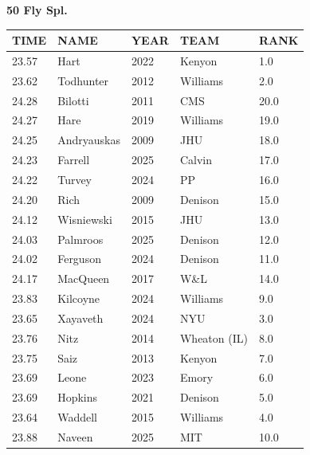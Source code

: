 \begin{table}[H]
\centering
\begin{minipage}[t]{0.6\textwidth}
\centering
\textbf{50 Fly Spl.}\\[0.1cm]
\begin{tabular}{@{}p{1.8cm}p{2.8cm}p{1.2cm}p{1.4cm}p{0.8cm}@{}}
\hline
    \textbf{TIME} & \textbf{NAME} & \textbf{YEAR} & \textbf{TEAM} & \textbf{RANK} \\
\hline
    23.57 & Hart & 2022 & Kenyon & 1.0 \\
    23.62 & Todhunter & 2012 & Williams & 2.0 \\
    24.28 & Bilotti & 2011 & CMS & 20.0 \\
    24.27 & Hare & 2019 & Williams & 19.0 \\
    24.25 & Andryauskas & 2009 & JHU & 18.0 \\
    24.23 & Farrell & 2025 & Calvin & 17.0 \\
    24.22 & Turvey & 2024 & PP & 16.0 \\
    24.20 & Rich & 2009 & Denison & 15.0 \\
    24.12 & Wisniewski & 2015 & JHU & 13.0 \\
    24.03 & Palmroos & 2025 & Denison & 12.0 \\
    24.02 & Ferguson & 2024 & Denison & 11.0 \\
    24.17 & MacQueen & 2017 & W\&L & 14.0 \\
    23.83 & Kilcoyne & 2024 & Williams & 9.0 \\
    23.65 & Xayaveth & 2024 & NYU & 3.0 \\
    23.76 & Nitz & 2014 & Wheaton (IL) & 8.0 \\
    23.75 & Saiz & 2013 & Kenyon & 7.0 \\
    23.69 & Leone & 2023 & Emory & 6.0 \\
    23.69 & Hopkins & 2021 & Denison & 5.0 \\
    23.64 & Waddell & 2015 & Williams & 4.0 \\
    23.88 & Naveen & 2025 & MIT & 10.0 \\
\hline
\end{tabular}
\end{minipage}
\end{table}

